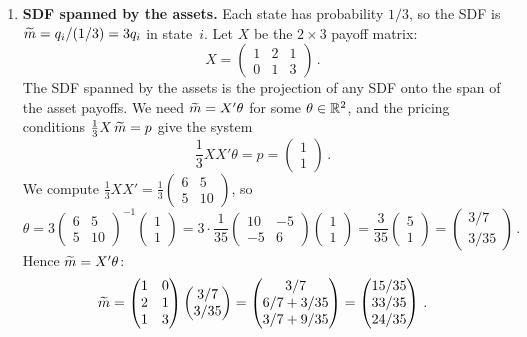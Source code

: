 \begin{enumerate}
\begin{enumerate}
\item[(b)] \textbf{SDF spanned by the assets.}  Each state has probability $1/3$, so the SDF is $\widetilde{m} = q_i/(1/3) = 3q_i$ in state~$i$.  Let $X$ be the $2\times 3$ payoff matrix:
\[
X = \begin{pmatrix} 1 & 2 & 1 \\ 0 & 1 & 3 \end{pmatrix}\,.
\]
The SDF spanned by the assets is the projection of any SDF onto the span of the asset payoffs.  We need $\widetilde{m} = X'\theta$ for some $\theta \in \mathbb{R}^2$, and the pricing conditions $\frac{1}{3}X\,\widetilde{m} = p$ give the system
\[
\frac{1}{3}X X'\theta = p = \begin{pmatrix}1\\1\end{pmatrix}\,.
\]
We compute $\frac{1}{3}XX' = \frac{1}{3}\begin{pmatrix} 6 & 5 \\ 5 & 10\end{pmatrix}$, so
\[
\theta = 3\begin{pmatrix}6&5\\5&10\end{pmatrix}^{-1}\begin{pmatrix}1\\1\end{pmatrix} = 3\cdot \frac{1}{35}\begin{pmatrix}10&-5\\-5&6\end{pmatrix}\begin{pmatrix}1\\1\end{pmatrix} = \frac{3}{35}\begin{pmatrix}5\\1\end{pmatrix} = \begin{pmatrix}3/7\\3/35\end{pmatrix}\,.
\]
Hence $\widetilde{m} = X'\theta$:
\[
\widetilde{m} = \begin{pmatrix}1&0\\2&1\\1&3\end{pmatrix}\begin{pmatrix}3/7\\3/35\end{pmatrix} = \begin{pmatrix}3/7 \\ 6/7+3/35 \\ 3/7+9/35\end{pmatrix} = \begin{pmatrix}15/35\\33/35\\24/35\end{pmatrix}\,.
\]
\end{enumerate}


\end{enumerate}
